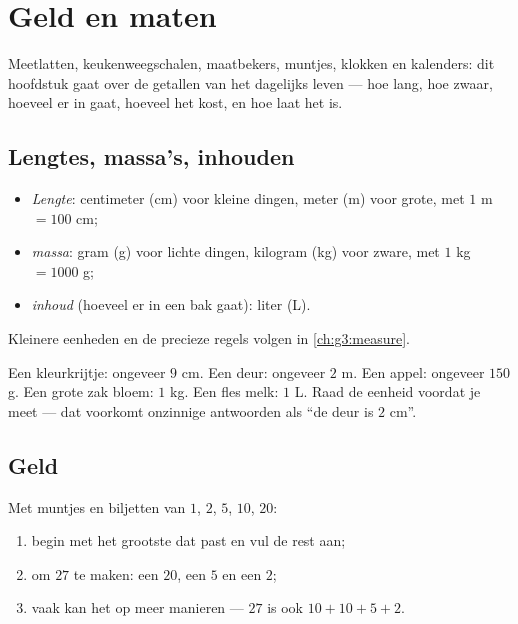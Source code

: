 \chapter{Geld en maten}\label{ch:g2:measure}

Meetlatten, keukenweegschalen, maatbekers, muntjes, klokken en
kalenders: dit hoofdstuk gaat over de getallen van het dagelijks leven
--- hoe lang, hoe zwaar, hoeveel er in gaat, hoeveel het kost, en hoe
laat het is.

\section{Lengtes, massa's, inhouden}

\begin{definition}\label{def:g2:measure:units}
\begin{itemize}
  \item \emph{Lengte}: centimeter (cm) voor kleine dingen, meter (m)
        voor grote, met $1$ m $= 100$ cm;
  \item \emph{massa}: gram (g) voor lichte dingen,
        kilogram (kg) voor zware, met $1$ kg $= 1000$ g;
  \item \emph{inhoud} (hoeveel er in een bak gaat): liter (L).
\end{itemize}
Kleinere eenheden en de precieze regels volgen in
\cref{ch:g3:measure}.
\end{definition}

\begin{example}\label{ex:g2:measure:choose}
Een kleurkrijtje: ongeveer $9$ cm. Een deur: ongeveer $2$ m. Een appel:
ongeveer $150$ g. Een grote zak bloem: $1$ kg. Een fles melk: $1$ L.
Raad de eenheid voordat je meet --- dat voorkomt onzinnige antwoorden
als ``de deur is $2$ cm''.
\end{example}

\section{Geld}

\begin{method}\label{met:g2:measure:money}
Met muntjes en biljetten van $1$, $2$, $5$, $10$, $20$:
\begin{enumerate}
  \item begin met het grootste dat past en vul de rest aan;
  \item om $27$ te maken: een $20$, een $5$ en een $2$;
  \item vaak kan het op meer manieren --- $27$ is ook
        $10 + 10 + 5 + 2$.
\end{enumerate}
\end{method}

